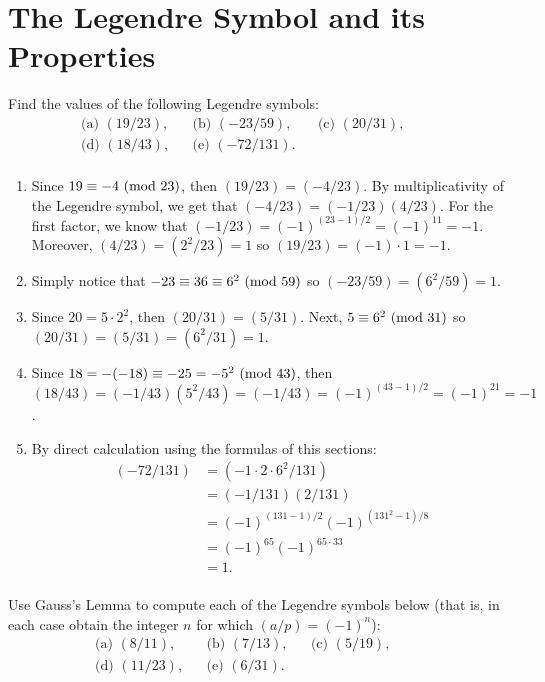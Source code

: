 \section{The Legendre Symbol and its Properties}

\begin{exercise}
    Find the values of the following Legendre symbols:
    \begin{align*}
        &\text{(a) } (19/23), & &\text{(b) } (-23/59), & &\text{(c) } (20/31),& & & & \\
        &\text{(d) } (18/43), & &\text{(e) } (-72/131). & & & & & & \\
    \end{align*}
\end{exercise}

\begin{solution}
    \begin{enumerate}
        \item Since $19 \equiv -4 \ (\mathrm{mod}\ 23)$, then $(19/23) = (-4/23)$. By multiplicativity of the Legendre symbol, we get that $(-4/23) = (-1/23)(4/23)$. For the first factor, we know that $(-1/23) = (-1)^{(23 - 1)/2} = (-1)^{11} = -1$. Moreover, $(4/23) = (2^2/23) = 1$ so $(19/23) = (-1)\cdot 1 = -1$.
        \item Simply notice that $-23 \equiv 36 \equiv 6^2 \ (\mathrm{mod}\ 59)$ so $(-23/59) = (6^2/59) = 1$.
        \item Since $20 = 5\cdot 2^2$, then $(20/31) = (5/31)$. Next, $5 \equiv 6^2 \ (\mathrm{mod}\ 31)$ so $(20/31) = (5/31) = (6^2/31) = 1$.
        \item Since $18 = -(-18) \equiv -25 = -5^2 \ (\mathrm{mod}\ 43)$, then $(18/43) = (-1/43)(5^2/43) = (-1/43) = (-1)^{(43 - 1)/2} = (-1)^{21} = -1$.
        \item By direct calculation using the formulas of this sections:
        \begin{align*}
            (-72/131) &= (-1\cdot 2 \cdot 6^2/131) \\
            &= (-1/131)(2/131) \\
            &= (-1)^{(131-1)/2}(-1)^{(131^2 - 1)/8} \\
            &= (-1)^{65}(-1)^{65\cdot 33} \\
            &= 1. \\
        \end{align*}
    \end{enumerate}
\end{solution}

\begin{exercise}
    Use Gauss's Lemma to compute each of the Legendre symbols below (that is, in each case obtain the integer $n$ for which $(a/p) = (-1)^n$):
    \begin{align*}
        &\text{(a) } (8/11), & &\text{(b) } (7/13), & &\text{(c) } (5/19),& & & & \\
        &\text{(d) } (11/23), & &\text{(e) } (6/31). & & & & & & \\
    \end{align*}
\end{exercise}

